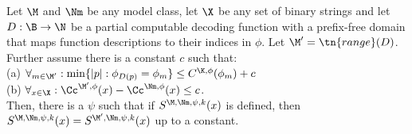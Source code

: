 \begin{lemma}
\label{lemma:thecoolone}
Let $\M$ and $\Nm$ be any model class, let $\X$ be any set of binary strings and let $D:\B\to\N$ be a partial computable decoding function with a prefix-free domain that maps function descriptions to their indices in $\phi$. Let $\M'= \tn{range}(D)$. Further assume there is a constant $c$ such that:\\
\-\hspace{1cm}(a) $\forall_{m\in\M'}:\min\{|p|:\phi_{D(p)}=\phi_m\}\le C^{\K,\phi}(\phi_m)+c$\\
\-\hspace{1cm}(b) $\forall_{x\in\X}: \Cc^{\M', \phi}(x) - \Cc^{\Nm, \phi}(x) \le c$.\\
Then, there is a $\psi$ such that if $S^{\M,\Nm,\psi,k}(x)$ is defined, then $S^{\M,\Nm,\psi,k}(x) = S^{\M',\Nm,\psi,k}(x)$ up to a constant. 
\end{lemma}

